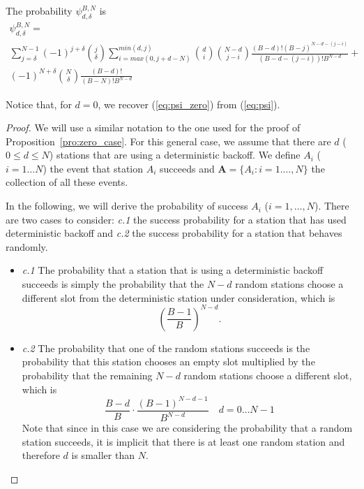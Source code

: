 \documentclass[journal]{IEEEtran}
\begin{document}
\begin{proposition}
\label{pro:general_case}
The probability $\psi^{B,N}_{d,\delta}$ is 
\begin{equation}
\begin{split}
\psi^{B,N}_{d,\delta} = \\
\sum_{j=\delta}^{N-1} (-1)^{j+\delta} \binom{j}{\delta} 
\sum_{i=max(0,j+d-N)}^{min(d,j)} \binom{d}{i} \binom{N-d}{j-i} 
\frac{(B-d)! (B-j)^{N-d-(j-i)}}{(B-d-(j-i))! B^{N-d}}
+ \\
(-1)^{N+\delta} \binom{N}{\delta} \frac{(B-d)!}{(B-N)!B^{N-d}}
\end{split}
\label{eq:psi}
\end{equation}
\end{proposition}

\begin{remark}
Notice that, for $d=0$,  we recover (\ref{eq:psi_zero}) from (\ref{eq:psi}).
\end{remark}

\begin{proof}
We will use a similar notation to the one used for the proof of Proposition~\ref{pro:zero_case}.
For this general case, we assume that there are $d$ ($0 \leq d \leq N$) stations that are using a deterministic backoff.
We define $A_i$ ($i=1\dots N$) the event that station $A_i$ succeeds and $\mathbf{A}=\{A_i:i=1. \dots, N \}$ the collection of all these events.

In the following, we will derive the probability of success $A_i$ ($i=1,\dots ,N$). There are two cases to consider: \emph{c.1} the success probability for a station that has used deterministic backoff and \emph{c.2} the success probability for a station that behaves randomly.

\begin{itemize}
\item \emph{c.1} The probability that a station that is using a deterministic backoff succeeds is simply the probability that the $N-d$ random stations choose a different slot from the deterministic station under consideration, which is
\begin{equation}
\label{eq:success_deterministic}
\left( \frac{B-1}{B} \right)^{N-d}.
\end{equation}
\item \emph{c.2} The probability that one of the random stations succeeds is the probability that this station chooses an empty slot multiplied by the probability that the remaining $N-d$ random stations choose a different slot, which is
\begin{equation}
\label{eq:success_random}
\frac{B-d}{B} \cdot \frac{(B-1)^{N-d-1}}{B^{N-d}}
\quad
d=0 \dots N-1
\end{equation}
Note that since in this case we are considering the probability that a random station succeeds, it is implicit that there is at least one random station and therefore $d$ is smaller than $N$.
\end{itemize}
\end{proof}
\end{document}
